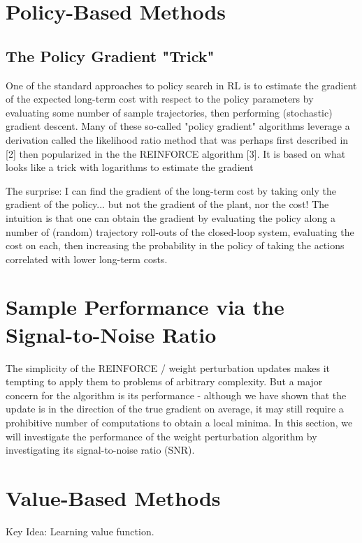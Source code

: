 \section{Policy-Based Methods}\label{sec:policy-based}
\subsection{The Policy Gradient "Trick"}
One of the standard approaches to policy search in RL is to estimate the gradient of the expected long-term cost with respect to the policy parameters by evaluating some number of sample trajectories, then performing (stochastic) gradient descent. Many of these so-called "policy gradient" algorithms leverage a derivation called the likelihood ratio method that was perhaps first described in [2] then popularized in the the REINFORCE algorithm [3]. It is based on what looks like a trick with logarithms to estimate the gradient

The surprise: I can find the gradient of the long-term cost by taking only the gradient of the policy... but not the gradient of the plant, nor the cost! The intuition is that one can obtain the gradient by evaluating the policy along a number of (random) trajectory roll-outs of the closed-loop system, evaluating the cost on each, then increasing the probability in the policy of taking the actions correlated with lower long-term costs.


\section{Sample Performance via the Signal-to-Noise Ratio}
The simplicity of the REINFORCE / weight perturbation updates makes it tempting to apply them to problems of arbitrary complexity. But a major concern for the algorithm is its performance - although we have shown that the update is in the direction of the true gradient on average, it may still require a prohibitive number of computations to obtain a local minima.
In this section, we will investigate the performance of the weight perturbation algorithm by investigating its signal-to-noise ratio (SNR).


\section{Value-Based Methods}\label{sec:value-based}
Key Idea: Learning value function.
